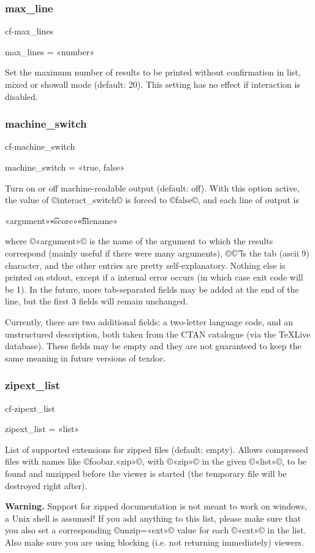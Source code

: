 \documentclass[a4paper, oneside]{scrartcl}
\makeatletter
\newcommand\texlive{%
  \TeX\thinspace Live\xspace}
\newif\ifframed
\newenvironment{cmdsubsub}[2]{%
  \framedfalse \commandes\subsubsection{#1}{#2}%
  }{%
  \endcommandes}
\newenvironment{htcode}{%
  \SaveVerbatim[samepage, gobble=2]{verbmat}%
  }{%
  \endSaveVerbatim
  \par\medskip\noindent\hspace*{\parindent}%
  \BUseVerbatim{verbmat}%
  \par\medskip\@endpetrue}
\makeatother
\begin{document}
\begin{cmdsubsub}{max_line}{cf-max_lines}
  max_lines = «number»
\end{cmdsubsub}

Set the maximum number of results to be printed without confirmation in list,
mixed or showall mode (default: 20). This setting has no effect if interaction
is disabled.

\begin{cmdsubsub}{machine_switch}{cf-machine_switch}
  machine_switch = «true, false»
\end{cmdsubsub}

Turn on or off machine-readable output (default: off).  With this option
active, the value of ©interact_switch© is forced to ©false©, and each line of
output is
\begin{htcode}
  «argument»\t«score»\t«filename»
\end{htcode}
where ©«argument»© is the name of the argument to which the results correspond
(mainly useful if there were many arguments), ©\t© is the tab (ascii 9)
character, and the other entries are pretty self-explanatory. Nothing else is
printed on stdout, except if a internal error occurs (in which case exit code
will be 1). In the future, more tab-separated fields may be added at the end
of the line, but the first 3 fields will remain unchanged.

Currently, there are two additional fields: a two-letter language code, and an
unstructured description, both taken from the CTAN catalogue (via the \texlive
database). These fields may be empty and they are not guaranteed to keep the
same meaning in future versions of texdoc.

\begin{cmdsubsub}{zipext_list}{cf-zipext_list}
  zipext_list = «list»
\end{cmdsubsub}

List of supported extensions for zipped files (default: empty).  Allows
compressed files with names like ©foobar.«zip»©, with ©«zip»© in the given
©«list»©, to be found and unzipped before the viewer is started (the
temporary file will be destroyed right after).

\textbf{Warning.} Support for zipped documentation is not meant to work on
windows, a Unix shell is assumed! If you add anything to this list, please
make sure that you also set a corresponding ©unzip=«ext»© value for each
©«ext»© in the list. Also make sure you are using blocking (i.e. not returning
immediately) viewers.
\end{document}
